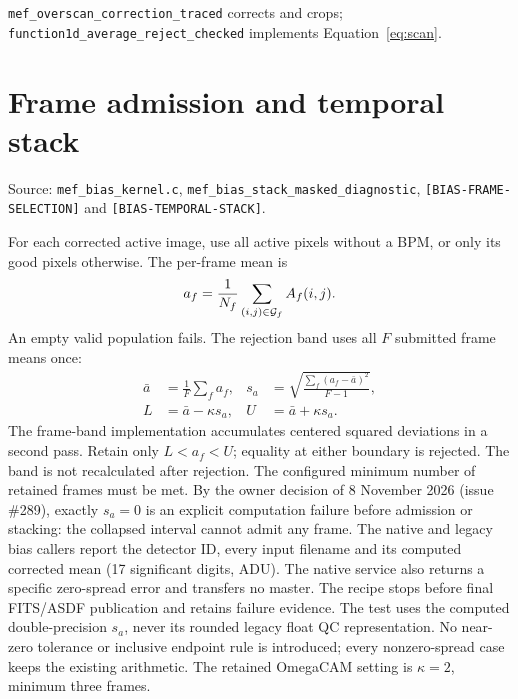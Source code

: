 \documentclass[11pt,a4paper]{article}
\newcommand{\code}[1]{\nolinkurl{#1}}
\begin{document}
\code{mef_overscan_correction_traced} corrects and crops;
\code{function1d_average_reject_checked} implements Equation~\eqref{eq:scan}.

\newpage
\section{Frame admission and temporal stack}
Source: \code{mef_bias_kernel.c}, \code{mef_bias_stack_masked_diagnostic},
\code{[BIAS-FRAME-SELECTION]} and \code{[BIAS-TEMPORAL-STACK]}.

For each corrected active image, use all active pixels without a BPM, or only
its good pixels otherwise. The per-frame mean is
\[
 a_f=\frac{1}{N_f}\sum_{(i,j)\in{\cal G}_f} A_f(i,j).
\]
An empty valid population fails. The rejection band uses all $F$ submitted
frame means once:
\begin{align}
 \bar a&=\frac1F\sum_f a_f,&
 s_a&=\sqrt{\frac{\sum_f(a_f-\bar a)^2}{F-1}},\\
 L&=\bar a-\kappa s_a,& U&=\bar a+\kappa s_a.
\end{align}
The frame-band implementation accumulates centered squared deviations in a
second pass. Retain only $L<a_f<U$; equality at either boundary is rejected.
The band is not recalculated after rejection. The configured minimum number
of retained frames must be met. By the owner decision of 8 November 2026
(issue \#289), exactly $s_a=0$ is an explicit computation failure before
admission or stacking: the collapsed interval cannot admit any frame.
The native and legacy bias callers report the detector ID, every input filename
and its computed corrected mean (17 significant digits, ADU). The native service
also returns a specific zero-spread error and transfers no master. The recipe
stops before final FITS/ASDF publication and retains failure evidence.
The test uses the computed double-precision $s_a$, never its rounded legacy
float QC representation. No near-zero tolerance or inclusive endpoint rule is
introduced; every nonzero-spread case keeps the existing arithmetic.
The retained OmegaCAM setting is $\kappa=2$, minimum three frames.
\end{document}
